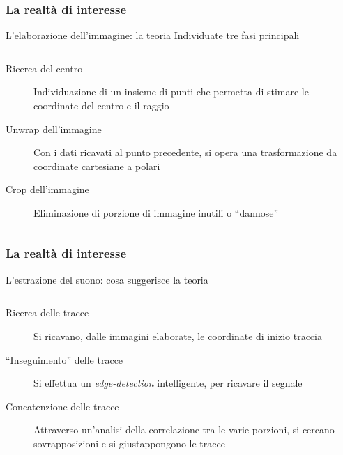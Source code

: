 \begin{frame}
\frametitle{La realtà di interesse}
\begin{block}{L'elaborazione dell'immagine: la teoria}
Individuate tre fasi principali
\begin{columns}[t]
\begin{column}{6.5cm}
\begin{description}
\item[Ricerca del centro] Individuazione di un insieme di punti che permetta 
di stimare le coordinate del centro e il raggio
\item[Unwrap dell'immagine] Con i dati ricavati al punto precedente, si
opera una trasformazione da coordinate cartesiane a polari
\item[Crop dell'immagine] Eliminazione di porzione di immagine inutili o
``dannose''
\end{description}
\end{column}
\vline
\begin{column}{3.5cm}

\end{column}
\end{columns}
\end{block}
\end{frame}

\begin{frame}
\frametitle{La realtà di interesse}
\begin{block}{L'estrazione del suono: cosa suggerisce la teoria}
\begin{columns}
\begin{column}{6.5cm}
\begin{description}
\item[Ricerca delle tracce] Si ricavano, dalle immagini elaborate, le coordinate
di inizio traccia
\item[``Inseguimento'' delle tracce] Si effettua un \emph{edge-detection}
intelligente, per ricavare il segnale
\item[Concatenzione delle tracce] Attraverso un'analisi della correlazione
tra le varie porzioni, si cercano sovrapposizioni e si giustappongono le 
tracce
\end{description}
\end{column}
\vline
\begin{column}{3.5cm}

\end{column}
\end{columns}
\end{block}
\end{frame}
